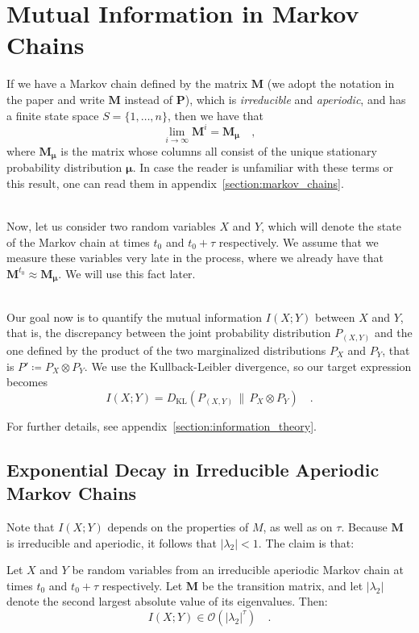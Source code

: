 \documentclass[../../main.tex]{subfiles}
\begin{document}
\section{Mutual Information in Markov Chains}
    If we have a Markov chain defined by the matrix $\boldsymbol{M}$ (we adopt the notation in the paper and write $\bm{M}$ instead of $\bm{P}$), which is \emph{irreducible} and \emph{aperiodic}, and has a finite state space $S = \{1, \dots, n\}$, then we have that
    \[
        \lim_{i \to \infty} \boldsymbol{M}^i = \boldsymbol{M}_{\boldsymbol{\mu}} \quad ,
    \]
    where $\boldsymbol{M_\mu}$ is the matrix whose columns all consist of the unique stationary probability distribution $\boldsymbol{\mu}$. In case the reader is unfamiliar with these terms or this result, one can read them in appendix~\ref{section:markov_chains}.

    ~\\
    Now, let us consider two random variables $X$ and $Y$, which will denote the state of the Markov chain at times $t_0$ and $t_0 + \tau$ respectively. We assume that we measure these variables very late in the process, where we already have that $\boldsymbol{M}^{t_0} \approx \boldsymbol{M}_{\boldsymbol{\mu}}$. We will use this fact later.

    ~\\
    Our goal now is to quantify the mutual information $I(X;Y)$ between $X$ and $Y$, that is, the discrepancy between the joint probability distribution $P_{(X, Y)}$ and the one defined by the product of the two marginalized distributions $P_X$ and $P_Y$, that is $P' \coloneqq P_X \otimes P_Y$. We use the Kullback-Leibler divergence, so our target expression becomes
    \[
        I(X;Y) = D_{\mathrm{KL}}(P_{(X, Y)} \,\|\, P_X \otimes P_Y) \quad .
    \]

    For further details, see appendix~\ref{section:information_theory}.

    \smallskip \noindent
    \subsection{Exponential Decay in Irreducible Aperiodic Markov Chains}
    Note that $I(X; Y)$ depends on the properties of $M$, as well as on $\tau$. Because $\boldsymbol{M}$ is irreducible and aperiodic, it follows that $|\lambda_2| < 1$. The claim is that:

    \begin{theorem}
        \label{theorem:no_power-law_in_irreducible_aperdioc_markov_chains}
        Let $X$ and $Y$ be random variables from an irreducible aperiodic Markov chain at times $t_0$ and $t_0 + \tau$ respectively. Let $\bm{M}$ be the transition matrix, and let $|\lambda_2|$ denote the second largest absolute value of its eigenvalues. Then:
        \[
            I(X; Y) \in \mathcal{O}(|\lambda_2|^\tau) \quad .
        \]
    \end{theorem}
    
\end{document}
